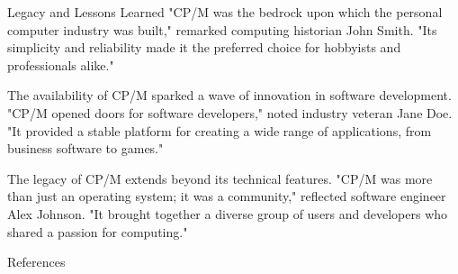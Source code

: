 \documentclass{beamer}
\begin{document}
\begin{frame}[t]{}
\begin{columns}
\begin{column}[T]{0.72\textwidth}
\begin{columns}[t]
\begin{column}{0.46\textwidth}
\begin{block}{\large Legacy and Lessons Learned}
"CP/M was the bedrock upon which the personal computer industry was built," remarked computing historian John Smith. "Its simplicity and reliability made it the preferred choice for hobbyists and professionals alike."

The availability of CP/M sparked a wave of innovation in software development. "CP/M opened doors for software developers," noted industry veteran Jane Doe. "It provided a stable platform for creating a wide range of applications, from business software to games."

The legacy of CP/M extends beyond its technical features. "CP/M was more than just an operating system; it was a community," reflected software engineer Alex Johnson. "It brought together a diverse group of users and developers who shared a passion for computing."\cite{giants}

\end{block}

\begin{block}{\large References}
  
\end{block}

\end{column}

\end{columns}

\end{column}

\end{columns}

\end{frame}
\end{document}
